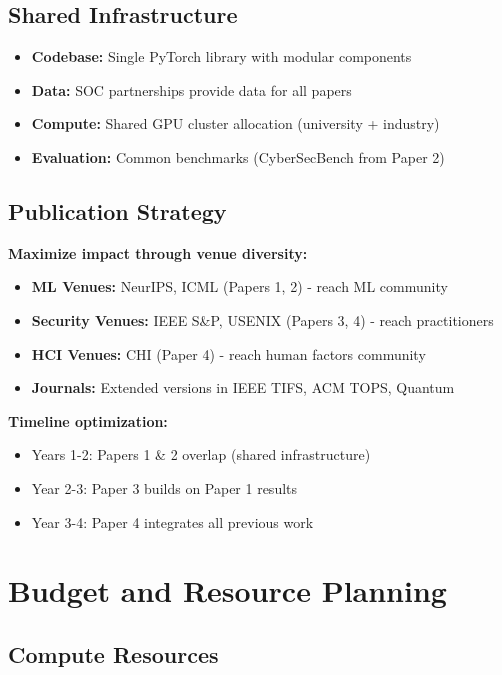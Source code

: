 \documentclass[11pt,letterpaper]{article}
\begin{document}
\subsection{Shared Infrastructure}

\begin{itemize}
\item \textbf{Codebase:} Single PyTorch library with modular components
\item \textbf{Data:} SOC partnerships provide data for all papers
\item \textbf{Compute:} Shared GPU cluster allocation (university + industry)
\item \textbf{Evaluation:} Common benchmarks (CyberSecBench from Paper 2)
\end{itemize}

\subsection{Publication Strategy}

\textbf{Maximize impact through venue diversity:}
\begin{itemize}
\item \textbf{ML Venues:} NeurIPS, ICML (Papers 1, 2) - reach ML community
\item \textbf{Security Venues:} IEEE S\&P, USENIX (Papers 3, 4) - reach practitioners
\item \textbf{HCI Venues:} CHI (Paper 4) - reach human factors community
\item \textbf{Journals:} Extended versions in IEEE TIFS, ACM TOPS, Quantum
\end{itemize}

\textbf{Timeline optimization:}
\begin{itemize}
\item Years 1-2: Papers 1 \& 2 overlap (shared infrastructure)
\item Year 2-3: Paper 3 builds on Paper 1 results
\item Year 3-4: Paper 4 integrates all previous work
\end{itemize}

\newpage

\section{Budget and Resource Planning}

\subsection{Compute Resources}
\end{document}
